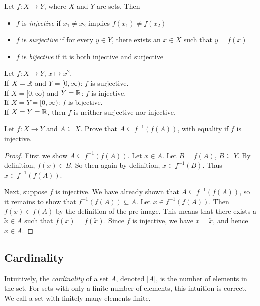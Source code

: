 \documentclass{article}
\begin{document}
\begin{definition}
Let $f:X \to Y$, where $X$ and $Y$ are sets. Then
\begin{itemize}
    \item $f$ is \emph{injective} if $x_1 \neq x_2$ implies $f(x_1) \neq f(x_2)$
    \item $f$ is \emph{surjective} if for every $y \in Y$, there exists an $x \in X$ such that $y = f(x)$
    \item $f$ is \emph{bijective} if it is both injective and surjective
\end{itemize}
\end{definition}

\begin{example}
Let $f:X \to Y$, $ x \mapsto x^2$. \\
If $X = {\mathbb{R}}$ and $Y= [0,\infty)$: $f$ is surjective. \\
If $X = [0,\infty)$ and $Y = {\mathbb{R}}$: $f$ is injective. \\
If $X = Y = [0,\infty)$: $f$ is bijective. \\
If $X=Y={\mathbb{R}}$, then $f$ is neither surjective nor injective.
\end{example}

\begin{proposition}
\label{prop:set_subset_preim_im}
Let $f: X \to Y$ and $A \subseteq X$. Prove that $A \subseteq f^{-1}(f(A))$, with equality if $f$ is injective. 
\end{proposition}
\begin{proof}
First we show $A \subseteq f^{-1}(f(A))$.
Let $x \in A$. Let $B = f(A)$, $B \subseteq Y$. By definition, $f(x) \in B$. So then again by definition, $x \in f^{-1}(B)$. Thus $x \in f^{-1}(f(A))$.

Next, suppose $f$ is injective. We have already shown that $A \subseteq f^{-1}(f(A))$, so it remains to show that  $f^{-1}(f(A)) \subseteq  A$. Let $x \in f^{-1}(f(A))$. Then $f(x) \in f(A)$ by the definition of the pre-image. This means that there exists a $\tilde x \in A$ such that $f(x) = f(\tilde x)$. Since $f$ is injective, we have $x = \tilde x$, and hence $x \in A$.
\end{proof}

\subsection{Cardinality}

Intuitively, the \emph{cardinality} of a set $A$, denoted $|A|$, is the number of elements in the set. For sets with only a finite number of elements, this intuition is correct. We call a set with finitely many elements finite. 
\end{document}
